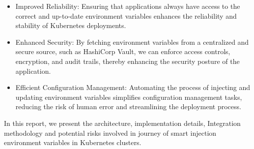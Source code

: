 \begin{itemize}
    \item Improved Reliability: Ensuring that applications always have access to the correct and up-to-date environment variables enhances the reliability and stability of Kubernetes deployments.
    
    \item Enhanced Security: By fetching environment variables from a centralized and secure source, such as HashiCorp Vault, we can enforce access controls, encryption, and audit trails, thereby enhancing the security posture of the application. \cite{vault}
    
    \item Efficient Configuration Management: Automating the process of injecting and updating environment variables simplifies configuration management tasks, reducing the risk of human error and streamlining the deployment process. \cite{vault-k8s}
    
\end{itemize}
\sloppy
In this report, we present the architecture, implementation details, Integration methodology and potential risks involved in journey of smart injection environment variables in Kubernetes clusters. 


